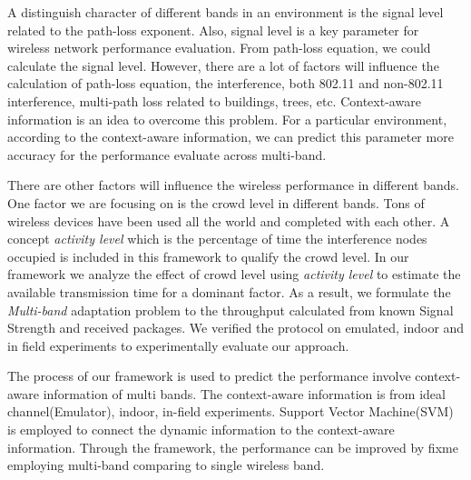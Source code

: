 A distinguish character of different bands in an environment is the signal level related to the path-loss exponent. Also, signal level is a key parameter for wireless network performance evaluation. From path-loss equation, we could calculate the signal level. However, there are a lot of factors will influence the calculation of path-loss equation, the interference, both 802.11 and non-802.11 interference, multi-path loss related to buildings, trees, etc.
Context-aware information is an idea to overcome this problem. For a particular environment, according to the context-aware information, we can predict this parameter more accuracy for the performance evaluate across multi-band.


There are other factors will influence the wireless performance in different bands. One factor we are focusing on is the crowd level in different bands. Tons of wireless devices have been used all the world and completed with each other. 
A concept \emph{activity level} which is the percentage of time the interference nodes occupied is included in this framework to qualify the crowd level. 
In our framework we analyze the effect of crowd level using \emph{activity level} to estimate the available transmission time for a dominant factor. As a result, we formulate the \emph{Multi-band} adaptation problem to the throughput calculated from known Signal Strength and received packages. We verified the protocol on emulated, indoor and in field experiments to experimentally evaluate our approach. 

The process of our framework is used to predict the performance involve context-aware information of multi bands. The context-aware information is from ideal channel(Emulator), indoor, in-field experiments. Support Vector Machine(SVM) is employed to connect the dynamic information to the context-aware information.  
Through the framework, the performance can be improved by fixme employing multi-band comparing to single wireless band.


